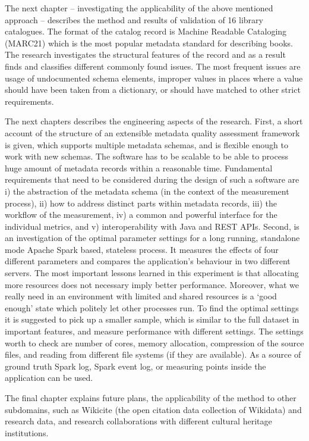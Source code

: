 The next chapter -- investigating the applicability of the above mentioned approach -- describes the method and results of validation of 16 library catalogues. The format of the catalog record is Machine Readable Cataloging (MARC21) which is the most popular metadata standard for describing books. The research investigates the structural features of the record and as a result finds and classifies different commonly found issues. The most frequent issues are usage of undocumented schema elements, improper values in places where a value should have been taken from a dictionary, or should have matched to other strict requirements.

The next chapters describes the engineering aspects of the research. First, a short account of the structure of an extensible metadata quality assessment framework is given, which supports multiple metadata schemas, and is flexible enough to work with new schemas. The software has to be scalable to be able to process huge amount of metadata records within a reasonable time. Fundamental requirements that need to be considered during the design of such a software are i) the abstraction of the metadata schema (in the context of the measurement process), ii) how to address distinct parts within metadata records, iii) the workflow of the measurement, iv) a common and powerful interface for the individual metrics, and v) interoperability with Java and REST APIs. Second, is an investigation of the optimal parameter settings for a long running, standalone mode Apache Spark based, stateless process. It measures the effects of four different parameters and compares the application's behaviour in two different servers. The most important lessons learned in this experiment is that allocating more resources does not necessary imply better performance. Moreover, what we really need in an environment with limited and shared resources is a ‘good enough' state which politely let other processes run. To find the optimal settings it is suggested to pick up a smaller sample, which is similar to the full dataset in important features, and measure performance with different settings. The settings worth to check are number of cores, memory allocation, compression of the source files, and reading from different file systems (if they are available). As a source of ground truth Spark log, Spark event log, or measuring points inside the application can be used.

The final chapter explains future plans, the applicability of the method to other subdomains, such as Wikicite (the open citation data collection of Wikidata) and research data, and research collaborations with different cultural heritage institutions.

